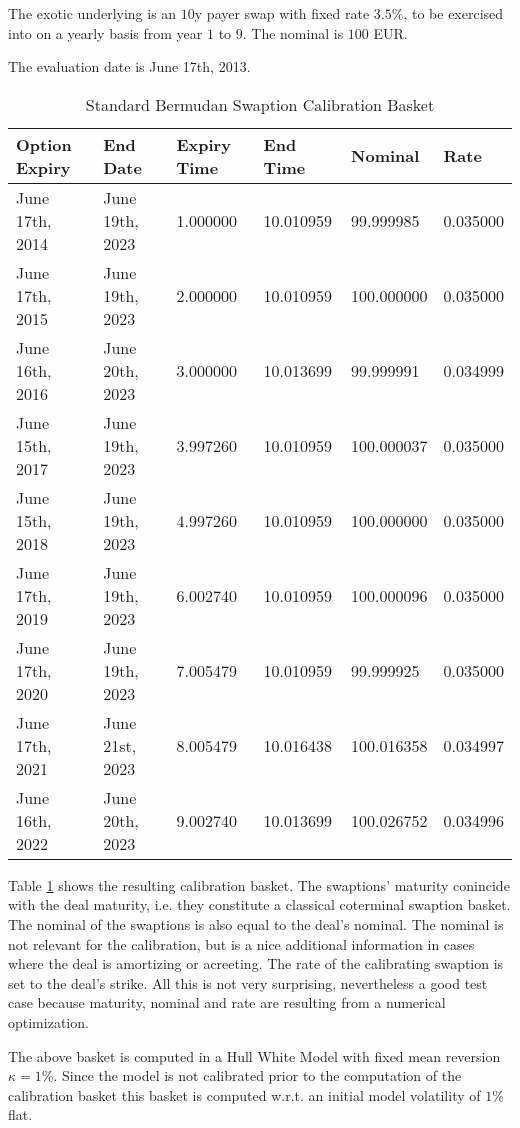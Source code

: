 \documentclass{amsart}
\theoremstyle{plain}
\numberwithin{equation}{section}
\begin{document}
The exotic underlying is an $10$y payer swap with fixed rate $3.5\%$, to be exercised into on a yearly basis from 
year $1$ to $9$. The nominal is $100$ EUR.

The evaluation date is June 17th, 2013.

\begin{table}[ht]
\caption{Standard Bermudan Swaption Calibration Basket}
\begin{tabular}{l | l | l | l | l | l}
Option Expiry & End Date & Expiry Time & End Time & Nominal & Rate \\ \hline
June 17th, 2014 & June 19th, 2023 & 1.000000 & 10.010959 & 99.999985 & 0.035000 \\
June 17th, 2015 & June 19th, 2023 & 2.000000 & 10.010959 & 100.000000 & 0.035000 \\
June 16th, 2016 & June 20th, 2023 & 3.000000 & 10.013699 & 99.999991 & 0.034999 \\
June 15th, 2017 & June 19th, 2023 & 3.997260 & 10.010959 & 100.000037 & 0.035000 \\
June 15th, 2018 & June 19th, 2023 & 4.997260 & 10.010959 & 100.000000 & 0.035000 \\
June 17th, 2019 & June 19th, 2023 & 6.002740 & 10.010959 & 100.000096 & 0.035000 \\
June 17th, 2020 & June 19th, 2023 & 7.005479 & 10.010959 & 99.999925 & 0.035000 \\
June 17th, 2021 & June 21st, 2023 & 8.005479 & 10.016438 & 100.016358 & 0.034997 \\
June 16th, 2022 & June 20th, 2023 & 9.002740 & 10.013699 & 100.026752 & 0.034996 \\
\end{tabular}
\label{stdBermundanSwaption}
\end{table}

Table \ref{stdBermundanSwaption} shows the resulting calibration basket. The swaptions' maturity conincide with
the deal maturity, i.e. they constitute a classical coterminal swaption basket. The nominal of the swaptions is
also equal to the deal's nominal. The nominal is not relevant for the calibration, but is a nice additional
information in cases where the deal is amortizing or acreeting. The rate of the calibrating swaption is set
to the deal's strike. All this is not very surprising, nevertheless a good test case because maturity, nominal and
rate are resulting from a numerical optimization.

The above basket is computed in a Hull White Model with fixed mean reversion $\kappa = 1\%$. Since the model is not
calibrated prior to the computation of the calibration basket this basket is computed w.r.t. an initial model
volatility of $1\%$ flat.
\end{document}

